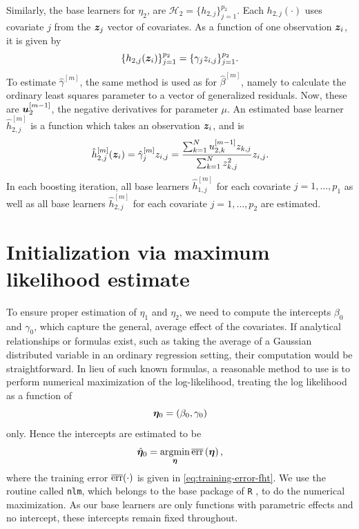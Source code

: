 Similarly, the base learners for $\eta_2$, are $\mathcal{H}_2=\{h_{2,j}\}_{j=1}^{p_2}$.
Each $h_{2,j}(\cdot)$ uses covariate $j$ from the $\bm{z}_j$ vector of covariates.
As a function of one observation $\bm{z}_i$, it is given by
\begin{equation*}
    \{h_{2,j}(\bm{z}_i)\}_{j=1}^{p_2}=\{\gamma_jz_{i,j}\}_{j=1}^{p_2}.
\end{equation*}
To estimate $\hat{\gamma}^{[m]}$, the same method is used as for $\hat{\beta}^{[m]}$, namely to calculate the ordinary least squares parameter to a vector of generalized residuals.
Now, these are $\bm{u}_2^{[m-1]}$, the negative derivatives for parameter $\mu$.
An estimated base learner $\hat{h}_{2,j}^{[m]}$ is a function which takes an observation $\bm{z}_i$, and is
\begin{equation*}
    \hat{h}_{2,j}^{[m]}(\bm{z}_i)=\hat{\gamma}^{[m]}_jz_{i,j}=\frac{\sum_{k=1}^N u_{2,k}^{[m-1]}z_{k,j}}{\sum_{k=1}^N z_{k,j}^2}z_{i,j}.
\end{equation*}
In each boosting iteration, all base learners $\hat{h}_{1,j}^{[m]}$ for each covariate $j=1,\ldots,p_1$ as well as all base learners $\hat{h}_{2,j}^{[m]}$ for each covariate $j=1,\ldots,p_2$ are estimated.

\section{Initialization via maximum likelihood estimate}
To ensure proper estimation of $\eta_1$ and $\eta_2$, we need to compute the intercepts $\beta_{0}$ and $\gamma_{0}$, which capture the general, average effect of the covariates.
If analytical relationships or formulas exist, such as taking the average of a Gaussian distributed variable in an ordinary regression setting, their computation would be straightforward.
In lieu of such known formulas, a reasonable method to use is to perform numerical maximization of the log-likelihood, treating the log likelihood as a function of
\begin{equation*}
    \boldsymbol{\eta}_0=\left(\beta_{0},\gamma_{0}\right)
\end{equation*}
only.
Hence the intercepts are estimated to be
\begin{equation*}
    \hat{\boldsymbol{\eta}}_0=\operatorname*{argmin}_{\boldsymbol{\eta}}\overline{\text{err}}\left(\boldsymbol{\eta}\right),
\end{equation*}
where the training error $\overline{\text{err}}(\cdot)$ is given in \ref{eq:training-error-fht}.
We use the routine called \verb|nlm|, which belongs to the base package of \verb|R| \citep{Rlang}, to do the numerical maximization.
As our base learners are only functions with parametric effects and no intercept, these intercepts remain fixed throughout.

